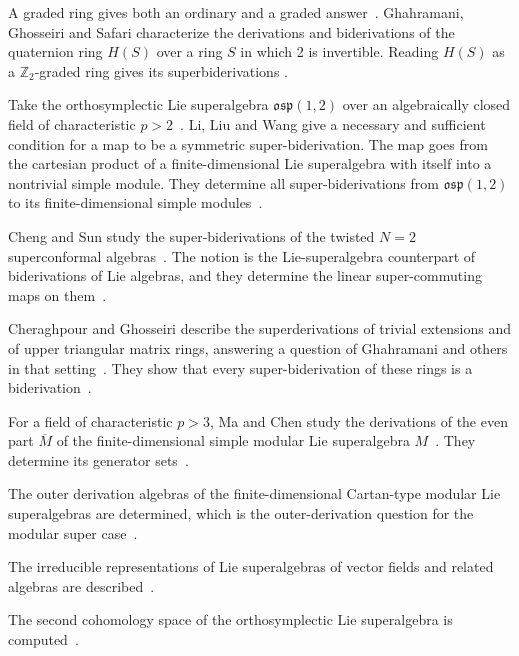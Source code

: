 A graded ring gives both an ordinary and a graded answer~\cite[Abstract]{GhahramaniGhosseiriSafari2020}. Ghahramani,
Ghosseiri and Safari characterize the derivations and biderivations of the
quaternion ring $H(S)$ over a ring $S$ in which 2 is invertible. Reading
$H(S)$ as a $\mathbb{Z}_2$-graded ring gives its superbiderivations
\cite[Abstract]{GhahramaniGhosseiriSafari2020}.

Take the orthosymplectic Lie superalgebra $\mathfrak{osp}(1,2)$ over an
algebraically closed field of characteristic $p>2$~\cite{WlSuperBiderivationsFromOsp12ToA2025}. Li, Liu and Wang give a
necessary and sufficient condition for a map to be a symmetric
super-biderivation. The map goes from the cartesian product of a
finite-dimensional Lie superalgebra with itself into a nontrivial simple
module. They determine all
super-biderivations from $\mathfrak{osp}(1,2)$ to its finite-dimensional
simple modules~\cite{WlSuperBiderivationsFromOsp12ToA2025}.

Cheng and Sun study the super-biderivations of the twisted $N=2$
superconformal algebras~\cite{WlSuperBiderivationsAndLinearSup2019}. The notion is the Lie-superalgebra counterpart of
biderivations of Lie algebras, and they determine the linear super-commuting
maps on them~\cite{WlSuperBiderivationsAndLinearSup2019}.

Cheraghpour and Ghosseiri describe the superderivations of trivial extensions
and of upper triangular matrix rings, answering a question of Ghahramani and
others in that setting~\cite{WlOnSuperderivationsAndSuperBide2019}. They show that every super-biderivation of these rings
is a biderivation~\cite{WlOnSuperderivationsAndSuperBide2019}.

For a field of characteristic $p>3$, Ma and Chen study the derivations of the
even part $\overline{M}$ of the finite-dimensional simple modular Lie
superalgebra $M$~\cite{WlDerivationsOfTheEvenPartOfFini2015}. They determine its generator
sets~\cite{WlDerivationsOfTheEvenPartOfFini2015}.

The outer derivation algebras of the finite-dimensional Cartan-type modular
Lie superalgebras are determined, which is the outer-derivation question for
the modular super case~\cite{WlTheOuterDerivationAlgebrasOfFi2020}.

The irreducible representations of Lie superalgebras of vector fields and
related algebras are described~\cite{WlIrreducibleRepresentationsOfLi2020}.

The second cohomology space of the orthosymplectic Lie superalgebra is
computed~\cite{WlSecondCohomologySpaceOfTheOrth2020}.
